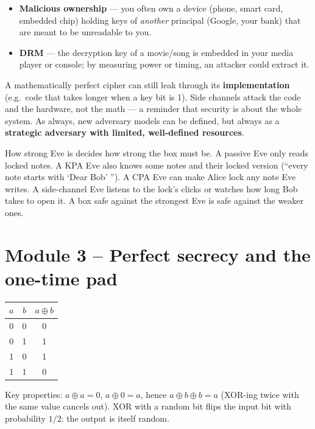 \begin{propbox}[title=Why are side channels realistic?]
\begin{itemize}
  \item \textbf{Malicious ownership} --- you often own a device (phone, smart card,
        embedded chip) holding keys of \emph{another} principal (Google, your bank) that
        are meant to be unreadable to you.
  \item \textbf{DRM} --- the decryption key of a movie/song is embedded in your media
        player or console; by measuring power or timing, an attacker could extract it.
\end{itemize}
\end{propbox}

\begin{rembox}[title=Algorithm vs.\ implementation]
A mathematically perfect cipher can still leak through its \textbf{implementation}
(e.g.\ code that takes longer when a key bit is 1). Side channels attack the code and
the hardware, not the math --- a reminder that security is about the whole system. As
always, new adversary models can be defined, but always as a \textbf{strategic adversary
with limited, well-defined resources}.
\end{rembox}

\begin{goatbox}
How strong Eve is decides how strong the box must be. A passive Eve only reads locked notes. A KPA
Eve also knows some notes and their locked version (``every note starts with `Dear Bob' ''). A
CPA Eve can make Alice lock any note Eve writes. A side-channel Eve listens to the lock's
clicks or watches how long Bob takes to open it. A box safe against the strongest Eve is safe
against the weaker ones.
\end{goatbox}

\section{Module 3 -- Perfect secrecy and the one-time pad}

\begin{rembox}[title={Reminder: XOR ($\oplus$)}]
\begin{center}
\begin{tabular}{cc|c}
$a$ & $b$ & $a \oplus b$ \\ \hline
0 & 0 & 0 \\ 0 & 1 & 1 \\ 1 & 0 & 1 \\ 1 & 1 & 0
\end{tabular}
\end{center}
Key properties: $a \oplus a = 0$, $a \oplus 0 = a$, hence $a \oplus b \oplus b = a$
(XOR-ing twice with the same value cancels out). XOR with a random bit flips the input
bit with probability $1/2$: the output is itself random.
\end{rembox}

